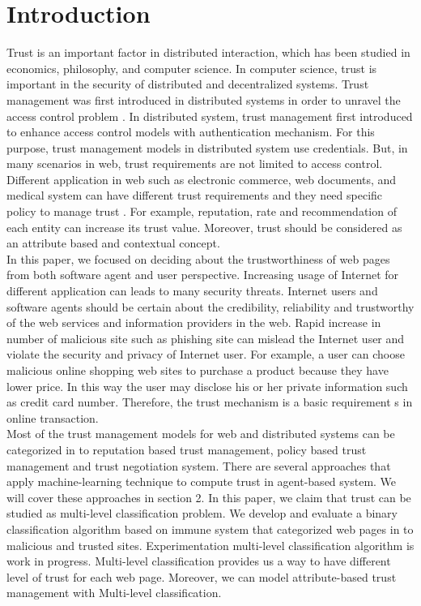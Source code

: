 \documentclass{llncs}
\begin{document}
\section{Introduction}
Trust is an important factor in  distributed interaction, which has been studied in economics, philosophy, and computer science.  In computer science, trust is important in the security of distributed and decentralized systems.  Trust management was first introduced in distributed systems in order to unravel the access control problem \cite{blaze}. In distributed system, trust management first introduced to enhance access control models with authentication mechanism. For this purpose, trust management models in distributed system use credentials. But, in many scenarios in  web, trust requirements are not limited to access control. Different application in web such as electronic commerce, web documents, and medical system can have different trust requirements and they need specific policy to  manage trust \cite{surveyInternt}. For example, reputation, rate and recommendation of each entity can  increase its trust value. Moreover, trust should be considered as an attribute based and contextual concept.\\
In this paper, we focused on deciding about the trustworthiness of web pages from both software agent and user perspective. Increasing usage of Internet for different application can leads to many security threats. Internet users and software agents should be certain about the credibility, reliability and trustworthy of the web services and information providers in the web.  Rapid increase in number of malicious site such as phishing site can mislead the Internet user and  violate the security and privacy of Internet user.  For example, a user can choose malicious online shopping web sites to purchase a product because they have lower price. In this way the user may disclose his or her private information such as credit card number. Therefore, the trust  mechanism is a basic requirement s in online transaction. \\
Most of the trust management models for web and distributed systems can be categorized in to reputation based trust management, policy based trust management and trust negotiation system.  There are several approaches that apply machine-learning technique to compute trust in agent-based system.  We will cover these approaches in section 2. In this paper, we claim that trust can be studied as multi-level classification problem.  We develop and evaluate a binary classification algorithm based on immune system that categorized web pages in to malicious and trusted sites.  Experimentation multi-level classification algorithm is work in progress. Multi-level classification provides us a way to have different level of trust for each web page. Moreover, we can model attribute-based trust management \cite{mitchell} with Multi-level classification. \\
\end{document}

